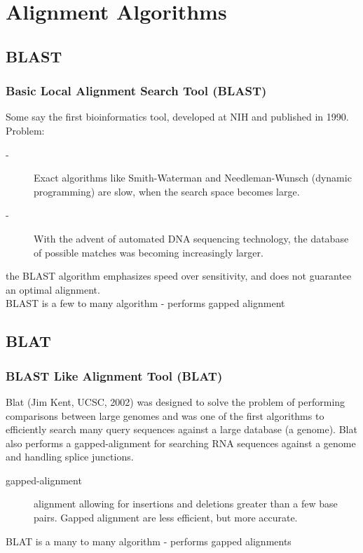 \documentclass[pdf]{beamer}
\begin{document}
\section{Alignment Algorithms}
\subsection{BLAST}
\begin{frame}
  \frametitle{Basic Local Alignment Search Tool (BLAST)}
  Some say the first bioinformatics tool, developed at NIH and published in 1990.\\
  Problem:\\
  \begin{description}
  \item[-] Exact algorithms like Smith-Waterman and Needleman-Wunsch (dynamic programming) are slow, when the search space becomes large.
  \item[-] With the advent of automated DNA sequencing technology, the database of possible matches was becoming increasingly larger.
  \end{description}
  the BLAST algorithm emphasizes speed over sensitivity, and does not guarantee an optimal alignment.\\
  \alert{BLAST is a few to many algorithm - performs gapped alignment}
\end{frame}

\subsection{BLAT}
\begin{frame}
  \frametitle{BLAST Like Alignment Tool (BLAT)}
  Blat (Jim Kent, UCSC, 2002) was designed to solve the problem of performing comparisons between large genomes and was one of the first algorithms to efficiently search many query sequences against a large database (a genome). Blat also performs a gapped-alignment for searching RNA sequences against a genome and handling splice junctions.\\
  \begin{description}
  \item[gapped-alignment] alignment allowing for insertions and deletions greater than a few base pairs. Gapped alignment are less efficient, but more accurate.\\
  \end{description}  
  \alert{BLAT is a many to many algorithm - performs gapped alignments}
\end{frame}
\end{document}
